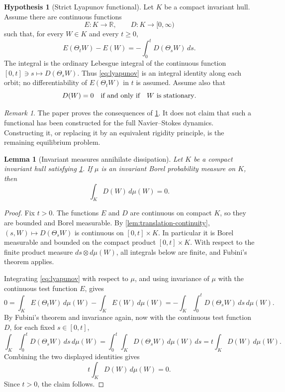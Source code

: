 \documentclass[11pt]{amsart}
\theoremstyle{plain}
\newtheorem{lemma}[theorem]{Lemma}
\theoremstyle{definition}
\newtheorem{hypothesis}[theorem]{Hypothesis}
\theoremstyle{remark}
\newtheorem{remark}[theorem]{Remark}
\numberwithin{equation}{section}
\begin{document}
\begin{hypothesis}[Strict Lyapunov functional]\label{hyp:lyapunov}
Let \(K\) be a compact invariant hull.  Assume there are continuous functions
\[
   E:K\to\mathbb R,\qquad D:K\to[0,\infty)
\]
such that, for every \(W\in K\) and every \(t\ge0\),
\begin{equation}\label{eq:lyapunov}
   E(\Theta_tW)-E(W)
   =
   -\int_0^t D(\Theta_sW)\,ds .
\end{equation}
The integral is the ordinary Lebesgue integral of the continuous function
\([0,t]\ni s\mapsto D(\Theta_sW)\).  Thus \eqref{eq:lyapunov} is an integral
identity along each orbit; no differentiability of \(E(\Theta_tW)\) in \(t\)
is assumed.
Assume also that
\begin{equation}\label{eq:zero-dissipation}
   D(W)=0
   \quad\hbox{if and only if}\quad
   W\hbox{ is stationary}.
\end{equation}
\end{hypothesis}

\begin{remark}
The paper proves the consequences of \cref{hyp:lyapunov}.  It does not claim
that such a functional has been constructed for the full Navier--Stokes
dynamics.  Constructing it, or replacing it by an equivalent rigidity
principle, is the remaining equilibrium problem.
\end{remark}

\begin{lemma}[Invariant measures annihilate dissipation]\label{lem:zero-diss}
Let \(K\) be a compact invariant hull satisfying \cref{hyp:lyapunov}.  If
\(\mu\) is an invariant Borel probability measure on \(K\), then
\[
   \int_K D(W)\,d\mu(W)=0 .
\]
\end{lemma}

\begin{proof}
Fix \(t>0\).  The functions \(E\) and \(D\) are continuous on compact \(K\),
so they are bounded and Borel measurable.  By
\cref{lem:translation-continuity}, \((s,W)\mapsto D(\Theta_sW)\) is continuous
on \([0,t]\times K\).  In particular it is Borel measurable and bounded on the
compact product \([0,t]\times K\).  With respect to the finite product measure
\(ds\otimes d\mu(W)\), all integrals below are finite, and Fubini's theorem
applies.

Integrating \eqref{eq:lyapunov} with respect to \(\mu\), and using invariance
of \(\mu\) with the continuous test function \(E\), gives
\[
   0
   =
   \int_K E(\Theta_tW)\,d\mu(W)-\int_KE(W)\,d\mu(W)
   =
   -\int_K\int_0^tD(\Theta_sW)\,ds\,d\mu(W).
\]
By Fubini's theorem and invariance again, now with the continuous test
function \(D\), for each fixed \(s\in[0,t]\),
\[
   \int_K\int_0^tD(\Theta_sW)\,ds\,d\mu(W)
   =
   \int_0^t\int_KD(\Theta_sW)\,d\mu(W)\,ds
   =
   t\int_KD(W)\,d\mu(W).
\]
Combining the two displayed identities gives
\[
   t\int_KD(W)\,d\mu(W)=0 .
\]
Since \(t>0\), the claim follows.
\end{proof}
\end{document}
